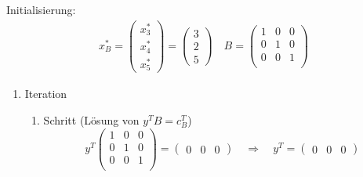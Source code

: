 \documentclass[a4paper]{scrartcl}
\begin{document}
\begin{enumerate}[label=\bfseries\arabic*.]
\begin{enumerate}
                Initialisierung:
                \begin{gather}
                    x_B^* =
                    \begin{pmatrix}
                        x_3^* \\ x_4^* \\ x_5^*
                    \end{pmatrix}
                    =
                    \begin{pmatrix}
                        3 \\ 2 \\ 5
                    \end{pmatrix}
                    \quad
                    B =
                    \begin{pmatrix}
                        1 & 0 & 0 \\
                        0 & 1 & 0 \\
                        0 & 0 & 1 \\
                    \end{pmatrix}
                \end{gather}

                \begin{enumerate}[1.]
                    \item Iteration
                        \begin{enumerate}[1.]
                            \item Schritt (Lösung von $y^TB = c_B^T$)
                                \begin{equation}
                                    y^T
                                    \begin{pmatrix}
                                        1 & 0 & 0 \\
                                        0 & 1 & 0 \\
                                        0 & 0 & 1 \\
                                    \end{pmatrix}
                                    =
                                    \begin{pmatrix}
                                        0 & 0 & 0
                                    \end{pmatrix}
                                    \quad\Rightarrow\quad
                                    y^T =
                                    \begin{pmatrix}
                                        0 & 0 & 0
                                    \end{pmatrix}
                                \end{equation}
                                

\end{enumerate}
\end{enumerate}
\end{enumerate}
\end{enumerate}
\end{document}
